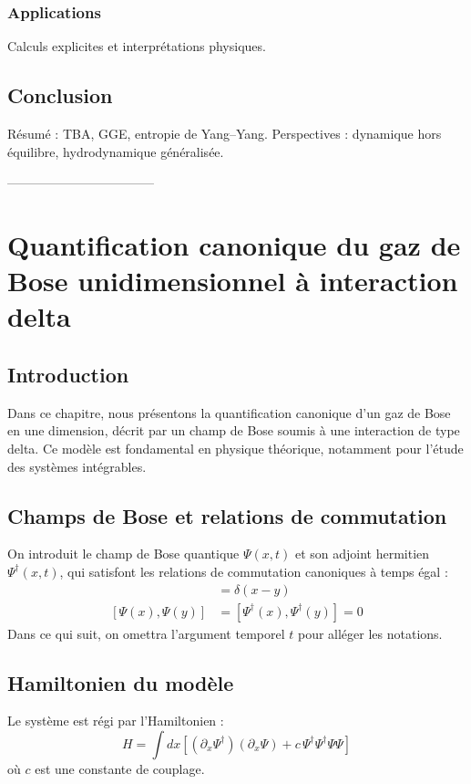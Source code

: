 \subsection{Applications}
Calculs explicites et interprétations physiques.

\section*{Conclusion}
Résumé : TBA, GGE, entropie de Yang–Yang. Perspectives : dynamique hors équilibre, hydrodynamique généralisée.


-----------------------------------

\chapter{Quantification canonique du gaz de Bose unidimensionnel à interaction delta}

\section{Introduction}
Dans ce chapitre, nous présentons la quantification canonique d’un gaz de Bose en une dimension, décrit par un champ de Bose soumis à une interaction de type delta. Ce modèle est fondamental en physique théorique, notamment pour l’étude des systèmes intégrables.

\section{Champs de Bose et relations de commutation}
On introduit le champ de Bose quantique $\Psi(x,t)$ et son adjoint hermitien $\Psi^\dagger(x,t)$, qui satisfont les relations de commutation canoniques à temps égal :
\begin{align}
[\Psi(x), \Psi^\dagger(y)] &= \delta(x - y) \\
[\Psi(x), \Psi(y)] &= [\Psi^\dagger(x), \Psi^\dagger(y)] = 0
\end{align}
Dans ce qui suit, on omettra l’argument temporel $t$ pour alléger les notations.

\section{Hamiltonien du modèle}
Le système est régi par l’Hamiltonien :
\begin{equation}
H = \int dx \left[ (\partial_x \Psi^\dagger)(\partial_x \Psi) + c\, \Psi^\dagger \Psi^\dagger \Psi \Psi \right]
\end{equation}
où $c$ est une constante de couplage.

